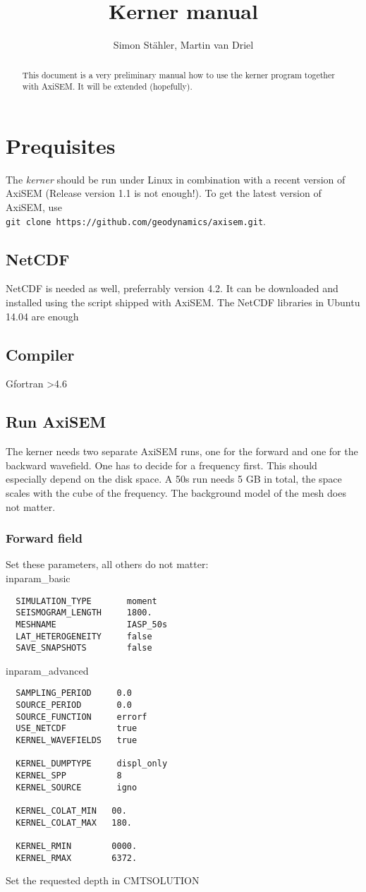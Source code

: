 \documentclass[a4wide]{scrartcl}
\author{Simon Stähler, Martin van Driel}
\title{Kerner manual}
\begin{document}
 \maketitle
 
 \begin{abstract}
  This document is a very preliminary manual how to use the kerner program together with AxiSEM. It will be extended (hopefully).
 \end{abstract} 
 
 \section{Prequisites}
 The \textit{kerner} should be run under Linux in combination with a recent version of AxiSEM (Release version 1.1 is not enough!). To get the latest version of AxiSEM, use \\
 \verb|git clone https://github.com/geodynamics/axisem.git|.
 
 \subsection{NetCDF}
 NetCDF is needed as well, preferrably version 4.2. It can be downloaded and installed using the script shipped with AxiSEM.
 The NetCDF libraries in Ubuntu 14.04 are enough
 
 \subsection{Compiler}
 Gfortran >4.6

 \subsection{Run AxiSEM}
 The kerner needs two separate AxiSEM runs, one for the forward and one for the backward wavefield. One has to decide for a frequency first. This should especially depend on the disk space. A 50s run needs 5 GB in total, the space scales with the cube of the frequency. The background model of the mesh does not matter.
 \subsubsection{Forward field}
 Set these parameters, all others do not matter: \\
 inparam\_basic
 \begin{verbatim}
  SIMULATION_TYPE   	moment
  SEISMOGRAM_LENGTH  	1800.
  MESHNAME            	IASP_50s
  LAT_HETEROGENEITY   	false
  SAVE_SNAPSHOTS       	false
 \end{verbatim}
 inparam\_advanced
 \begin{verbatim}
  SAMPLING_PERIOD     0.0
  SOURCE_PERIOD       0.0
  SOURCE_FUNCTION     errorf
  USE_NETCDF          true
  KERNEL_WAVEFIELDS   true
  
  KERNEL_DUMPTYPE     displ_only
  KERNEL_SPP          8
  KERNEL_SOURCE       igno
  
  KERNEL_COLAT_MIN   00.
  KERNEL_COLAT_MAX   180.

  KERNEL_RMIN        0000.
  KERNEL_RMAX        6372.
 \end{verbatim}
 Set the requested depth in CMTSOLUTION 
 
\end{document}
